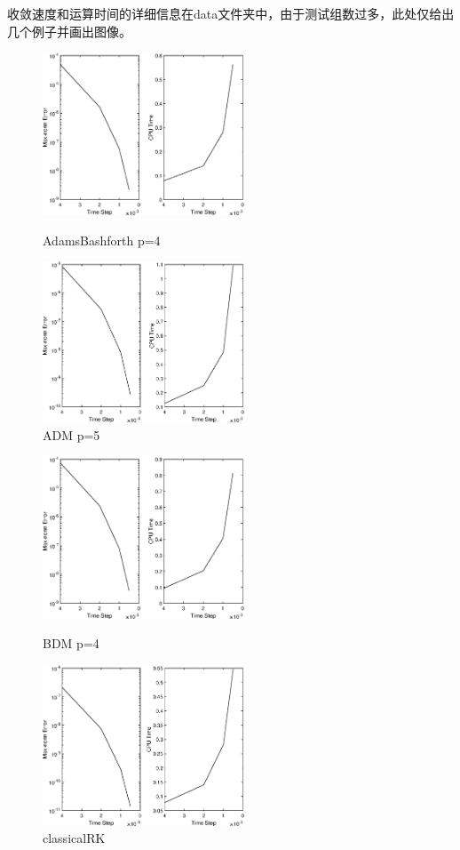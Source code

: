 \documentclass[12]{article}%
\begin{document}
收敛速度和运算时间的详细信息在data文件夹中，由于测试组数过多，此处仅给出几个例子并画出图像。

\begin{figure}[H]
    \centering
    \begin{minipage}[t]{0.48\textwidth}
    \centering
    \includegraphics[width=6cm]{../pic/AdamsBashforth4test2.eps}
    \caption{AdamsBashforth p=4}
    \end{minipage}
    \begin{minipage}[t]{0.48\textwidth}
    \centering
    \includegraphics[width=6cm]{../pic/AdamsMoulton5test2.eps}
    \caption{ADM p=5}
    \end{minipage}
\end{figure}
\begin{figure}[H]
    \centering
    \begin{minipage}[t]{0.48\textwidth}
    \centering
    \includegraphics[width=6cm]{../pic/BackDifferFormula4test2.eps}
    \caption{BDM p=4}
    \end{minipage}
    \begin{minipage}[t]{0.48\textwidth}
    \centering
    \includegraphics[width=6cm]{../pic/classicalRK4test2.eps}
    \caption{classicalRK}
    \end{minipage}
\end{figure}
\end{document}
